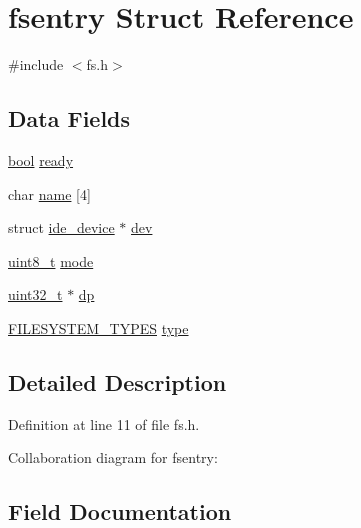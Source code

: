 \hypertarget{a00272}{}\section{fsentry Struct Reference}
\label{a00272}


{\ttfamily \#include $<$fs.\+h$>$}

\subsection*{Data Fields}
\begin{DoxyCompactItemize}
\item 
\hyperlink{a00140_af6a258d8f3ee5206d682d799316314b1_af6a258d8f3ee5206d682d799316314b1}{bool} \hyperlink{a00272_a284522ed97fe1eeebd0fcc039b2ea00a_a284522ed97fe1eeebd0fcc039b2ea00a}{ready}
\item 
char \hyperlink{a00272_a9c5a4f5b02eb2c9e9e797f79dc99028a_a9c5a4f5b02eb2c9e9e797f79dc99028a}{name} \mbox{[}4\mbox{]}
\item 
struct \hyperlink{a00224}{ide\+\_\+device} $\ast$ \hyperlink{a00272_aaea66ea744fa50f1c54666033884d8d2_aaea66ea744fa50f1c54666033884d8d2}{dev}
\item 
\hyperlink{a00140_aba7bc1797add20fe3efdf37ced1182c5_aba7bc1797add20fe3efdf37ced1182c5}{uint8\+\_\+t} \hyperlink{a00272_a6e71712bc3c51c21dc3362334937e4d7_a6e71712bc3c51c21dc3362334937e4d7}{mode}
\item 
\hyperlink{a00140_a435d1572bf3f880d55459d9805097f62_a435d1572bf3f880d55459d9805097f62}{uint32\+\_\+t} $\ast$ \hyperlink{a00272_ae1d22893563b8753e29fef01f0782ba5_ae1d22893563b8753e29fef01f0782ba5}{dp}
\item 
\hyperlink{a00161_a2e9d0c3765a28910638672bfc746181b_a2e9d0c3765a28910638672bfc746181b}{F\+I\+L\+E\+S\+Y\+S\+T\+E\+M\+\_\+\+T\+Y\+P\+ES} \hyperlink{a00272_acbab3dd44174c8f74e1d9305a13c7dbb_acbab3dd44174c8f74e1d9305a13c7dbb}{type}
\end{DoxyCompactItemize}


\subsection{Detailed Description}


Definition at line 11 of file fs.\+h.



Collaboration diagram for fsentry\+:


\subsection{Field Documentation}
\mbox{\label{a00272_aaea66ea744fa50f1c54666033884d8d2_aaea66ea744fa50f1c54666033884d8d2}} 
